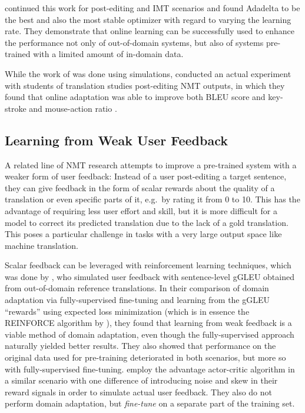 \textcite{peris-2019} continued this work for post-editing and IMT scenarios and
found Adadelta to be the best and also the most stable optimizer with regard to
varying the learning rate. They demonstrate that online learning can be
successfully used to enhance the performance not only of out-of-domain systems,
but also of systems pre-trained with a limited amount of in-domain data.

While the work of \textcites{turchi-2017}{peris-2017}{peris-2019} was done using
simulations, \textcite{karimova-2018} conducted an actual experiment with
students of translation studies post-editing NMT outputs, in which they found
that online adaptation was able to improve both BLEU score and key-stroke and
mouse-action ratio \parencite[for KSMR cf.][]{barrachina-2009}.

\subsection{Learning from Weak User Feedback}

A related line of NMT research attempts to improve a pre-trained system with a
weaker form of user feedback: Instead of a user post-editing a target sentence,
they can give feedback in the form of scalar rewards about the quality of a
translation or even specific parts of it, e.g.\ by rating it from 0 to 10. This
has the advantage of requiring less user effort and skill, but it is more
difficult for a model to correct its predicted translation due to the lack of a
gold translation. This poses a particular challenge in tasks with a very large
output space like machine translation.

Scalar feedback can be leveraged with reinforcement learning techniques, which
was done by \textcite{kreutzer-2017}, who simulated user feedback with
sentence-level gGLEU \parencite{wu-2016} obtained from out-of-domain reference
translations. In their comparison of domain adaptation via fully-supervised
fine-tuning and learning from the gGLEU \enquote{rewards} using expected loss
minimization (which is in essence the REINFORCE algorithm by
\textcite{williams-1992}), they found that learning from weak feedback is a
viable method of domain adaptation, even though the fully-supervised approach
naturally yielded better results. They also showed that performance on the
original data used for pre-training deteriorated in both scenarios, but more so
with fully-supervised fine-tuning. \textcite{nguyen-2017} employ the advantage
actor-critic algorithm \parencite{mnih-2016} in a similar scenario with one
difference of introducing noise and skew in their reward signals in order to
simulate actual user feedback. They also do not perform domain adaptation, but
\emph{fine-tune} on a separate part of the training set.

